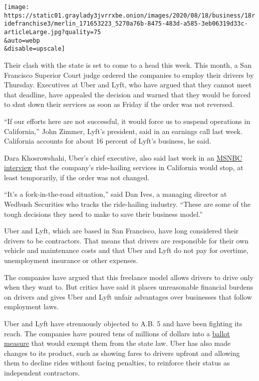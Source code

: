 \texttt{[image: https://static01.graylady3jvrrxbe.onion/images/2020/08/18/business/18ridefranchise3/merlin\_171653223\_5270a76b-8475-483d-a585-3eb06319d33c-articleLarge.jpg?quality=75\\\&auto=webp\\\&disable=upscale]}

Their clash with the state is set to come to a head this week. This
month, a San Francisco Superior Court judge ordered the companies to
employ their drivers by Thursday. Executives at Uber and Lyft, who have
argued that they cannot meet that deadline, have appealed the decision
and warned that they would be forced to shut down their services as soon
as Friday if the order was not reversed.

``If our efforts here are not successful, it would force us to suspend
operations in California,'' John Zimmer, Lyft's president, said in an
earnings call last week. California accounts for about 16 percent of
Lyft's business, he said.

Dara Khosrowshahi, Uber's chief executive, also said last week in an
\href{https://www.cnbc.com/2020/08/12/uber-may-shut-down-temporarily-in-california.html}{MSNBC
interview} that the company's ride-hailing services in California would
stop, at least temporarily, if the order was not changed.

``It's a fork-in-the-road situation,'' said Dan Ives, a managing
director at Wedbush Securities who tracks the ride-hailing industry.
``These are some of the tough decisions they need to make to save their
business model.''

Uber and Lyft, which are based in San Francisco, have long considered
their drivers to be contractors. That means that drivers are responsible
for their own vehicle and maintenance costs and that Uber and Lyft do
not pay for overtime, unemployment insurance or other expenses.

The companies have argued that this freelance model allows drivers to
drive only when they want to. But critics have said it places
unreasonable financial burdens on drivers and gives Uber and Lyft unfair
advantages over businesses that follow employment laws.

Uber and Lyft have strenuously objected to A.B. 5 and have been fighting
its reach. The companies have poured tens of millions of dollars into a
\href{https://www.nytimes3xbfgragh.onion/2019/08/29/technology/uber-lyft-ballot-initiative.html}{ballot
measure} that would exempt them from the state law. Uber has also made
changes to its product, such as showing fares to drivers upfront and
allowing them to decline rides without facing penalties, to reinforce
their status as independent contractors.

